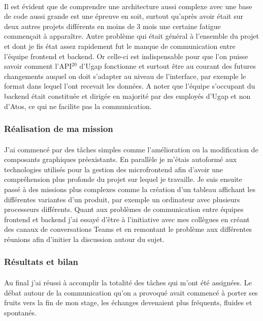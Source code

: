 \documentclass[12pt]{article}
\begin{document}
\begin {sloppypar}
\paragraph{}
Il est évident que de comprendre une architecture aussi complexe avec une base de code aussi grande 
est une épreuve en soit, surtout qu'après avoir était sur deux autres projets différents en moins de 3 mois
une certaine fatigue commençait à apparaître. Autre problème qui était général à l'ensemble du projet
et dont je fis état assez rapidement fut le manque de communication entre l'équipe frontend et backend. 
Or celle-ci est indispensable pour que l'on puisse savoir comment l'API$^{20}$ d'Ugap fonctionne et
surtout être au courant des futures changements auquel on doit s'adapter au niveau de l'interface,
par exemple le format dans lequel l'ont recevait les données. A noter que l'équipe s'occupant du 
backend était constituée et dirigée en majorité par des employés d'Ugap et non d'Atos, ce qui ne 
facilite pas la communication.
\subsubsection{Réalisation de ma mission}
\paragraph{}
J'ai commencé par des tâches simples comme l'amélioration ou la modification de composants graphiques
préexistants. En parallèle je m'étais autoformé aux technologies utilisés pour la gestion des microfrontend 
afin d'avoir une compréhension plus profonde du projet sur lequel je travaille. Je suis ensuite passé à des missions 
plus complexes comme la création d'un tableau affichant les différentes variantes d'un produit, par exemple
un ordinateur avec plusieurs processeurs différents. Quant aux problèmes de communication entre équipes frontend 
et backend j'ai essayé d'être à l'initiative avec mes collègues en créant des canaux de conversations Teams 
et en remontant le problème aux différentes réunions afin d'initier la discussion autour du sujet.

\subsubsection{Résultats et bilan}
\paragraph{}
Au final j'ai réussi à accomplir la totalité des tâches qui m'ont été assignées. Le débat autour de la communication 
qu'on a provoqué avait commencé à porter ses fruits vers la fin de mon stage, les échanges devenaient plus 
fréquents, fluides et spontanés. 

\end{sloppypar}
\end{document}
